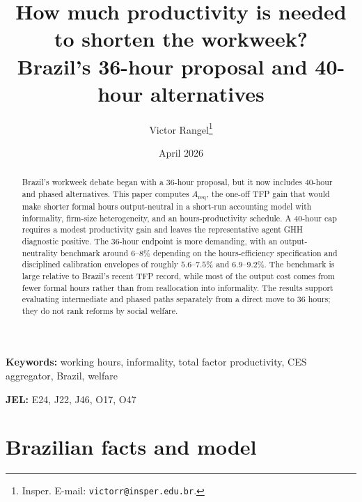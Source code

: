 \documentclass[12pt,a4paper]{article}
\title{How much productivity is needed to shorten the workweek?\\
Brazil's 36-hour proposal and 40-hour alternatives}
\author{Victor Rangel\thanks{Insper. E-mail: \texttt{victorr@insper.edu.br}.}}
\date{April 2026}
\begin{document}
\maketitle

\begin{abstract}
Brazil's workweek debate began with a 36-hour proposal, but it now includes 40-hour and phased alternatives. This paper computes $A_{\text{req}}$, the one-off TFP gain that would make shorter formal hours output-neutral in a short-run accounting model with informality, firm-size heterogeneity, and an hours-productivity schedule. A 40-hour cap requires a modest productivity gain and leaves the representative agent GHH diagnostic positive. The 36-hour endpoint is more demanding, with an output-neutrality benchmark around $6$--$8\%$ depending on the hours-efficiency specification and disciplined calibration envelopes of roughly $5.6$--$7.5\%$ and $6.9$--$9.2\%$. The benchmark is large relative to Brazil's recent TFP record, while most of the output cost comes from fewer formal hours rather than from reallocation into informality. The results support evaluating intermediate and phased paths separately from a direct move to 36 hours; they do not rank reforms by social welfare.
\end{abstract}

\textbf{Keywords:} working hours, informality, total factor productivity, CES aggregator, Brazil, welfare

\textbf{JEL:} E24, J22, J46, O17, O47

\clearpage



\section{Brazilian facts and model}\label{sec:framework}






\end{document}
